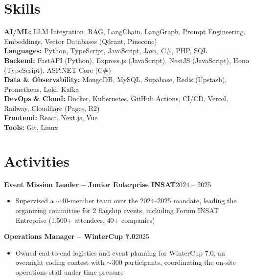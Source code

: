 \documentclass[10pt,a4paper]{article}
\newcommand{\entry}[2]{\vspace{1pt}\noindent\textbf{#1}\hfill{\color{muted}#2}\par}
\begin{document}
\section{Skills}
\textbf{AI/ML:} LLM Integration, RAG, LangChain, LangGraph, Prompt Engineering, Embeddings, Vector Databases (Qdrant, Pinecone)\\
\textbf{Languages:} Python, TypeScript, JavaScript, Java, C\#, PHP, SQL\\
\textbf{Backend:} FastAPI (Python), Express.js (JavaScript), NestJS (JavaScript), Hono (TypeScript), ASP.NET Core (C\#)\\
\textbf{Data \& Observability:} MongoDB, MySQL, Supabase, Redis (Upstash), Prometheus, Loki, Kafka\\
\textbf{DevOps \& Cloud:} Docker, Kubernetes, GitHub Actions, CI/CD, Vercel, Railway, Cloudflare (Pages, R2)\\
\textbf{Frontend:} React, Next.js, Vue\\
\textbf{Tools:} Git, Linux

\section{Activities}
\entry{Event Mission Leader -- Junior Enterprise INSAT}{2024 -- 2025}
\begin{itemize}
  \item Supervised a $\sim$40-member team over the 2024--2025 mandate, leading the organizing committee for 2 flagship events, including Forum INSAT Entreprise (1,500+ attendees, 40+ companies)
\end{itemize}
\entry{Operations Manager -- WinterCup 7.0}{2025}
\begin{itemize}
  \item Owned end-to-end logistics and event planning for WinterCup 7.0, an overnight coding contest with $\sim$300 participants, coordinating the on-site operations staff under time pressure
\end{itemize}
\end{document}
